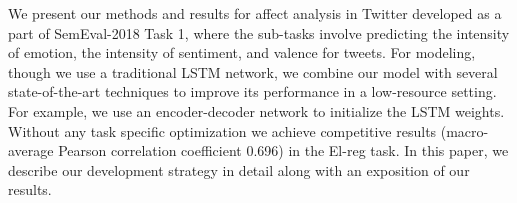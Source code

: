 We present our methods and results for affect analysis in Twitter developed as a part of SemEval-2018 Task 1, where the sub-tasks involve predicting the intensity of emotion, the intensity of sentiment, and valence for tweets. For modeling, though we use a traditional LSTM network, we combine our model with several state-of-the-art techniques to improve its performance in a low-resource setting. For example, we use an encoder-decoder network to initialize the LSTM weights. Without any task specific optimization we achieve competitive results (macro-average Pearson correlation coefficient 0.696) in the El-reg task. In this paper, we describe our development strategy in detail along with an exposition of our results.

